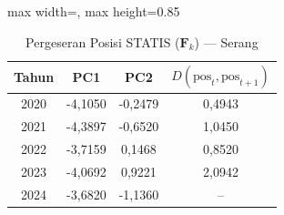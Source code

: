 \begin{table}[H]
\centering
\caption{Pergeseran Posisi STATIS ($\mathbf{F}_k$) --- Serang} \label{tab:app1jarak_statis_skor_serang}
\begin{adjustbox}{max width=\textwidth, max height=0.85\textheight}
\begin{tabular}{|c|c|c|c|}
\hline
\textbf{Tahun} & \textbf{PC1} & \textbf{PC2} & \textbf{$D(\text{pos}_t, \text{pos}_{t+1})$} \\
\hline
2020 & -4,1050 & -0,2479 & 0,4943 \\
2021 & -4,3897 & -0,6520 & 1,0450 \\
2022 & -3,7159 & 0,1468 & 0,8520 \\
2023 & -4,0692 & 0,9221 & 2,0942 \\
2024 & -3,6820 & -1,1360 & -- \\
\hline
\end{tabular}
\end{adjustbox}
\end{table}